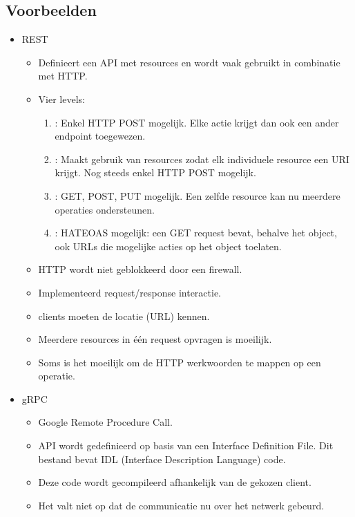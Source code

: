	\subsection{Voorbeelden}
	\begin{itemize}
		\item REST
		\begin{itemize}
			\item Definieert een API met resources en wordt vaak gebruikt in combinatie met HTTP.
			\item Vier levels:
			\begin{enumerate}
				\item[0]: Enkel HTTP POST mogelijk. Elke actie krijgt dan ook een ander endpoint toegewezen.
				\item[1]: Maakt gebruik van resources zodat elk individuele resource een URI krijgt. Nog steeds enkel HTTP POST mogelijk.
				\item[2]: GET, POST, PUT mogelijk. Een zelfde resource kan nu meerdere operaties ondersteunen.
				\item[3]: HATEOAS mogelijk: een GET request bevat, behalve het object, ook URLs die mogelijke acties op het object toelaten.
			\end{enumerate}
			\item[\good] HTTP wordt niet geblokkeerd door een firewall.
			\item[\good] Implementeerd request/response interactie.
			\item[\alert] clients moeten de locatie (URL) kennen.
			\item[\alert] Meerdere resources in één request opvragen is moeilijk. 
			\item[\alert] Soms is het moeilijk om de HTTP werkwoorden te mappen op een operatie.
		\end{itemize}
		\item gRPC
		\begin{itemize}
			\item Google Remote Procedure Call.
			\item API wordt gedefinieerd op basis van een Interface Definition File. Dit bestand bevat IDL (Interface Description Language) code.
			\item Deze code wordt gecompileerd afhankelijk van de gekozen client.
			\item[\alert] Het valt niet op dat de communicatie nu over het netwerk gebeurd.
		\end{itemize}
	\end{itemize}
